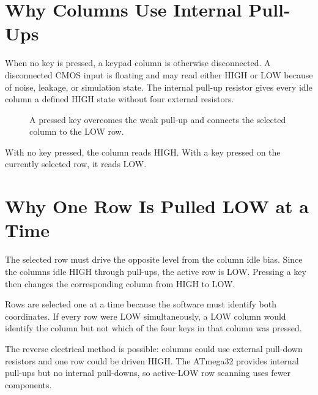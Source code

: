 \documentclass[11pt,a4paper]{article}
\begin{document}
\section{Why Columns Use Internal Pull-Ups}
When no key is pressed, a keypad column is otherwise disconnected. A disconnected CMOS input is floating and may read either HIGH or LOW because of noise, leakage, or simulation state. The internal pull-up resistor gives every idle column a defined HIGH state without four external resistors.

\begin{figure}[H]
\centering
{}
\caption{A pressed key overcomes the weak pull-up and connects the selected column to the LOW row.}
\end{figure}

With no key pressed, the column reads HIGH. With a key pressed on the currently selected row, it reads LOW.

\section{Why One Row Is Pulled LOW at a Time}
The selected row must drive the opposite level from the column idle bias. Since the columns idle HIGH through pull-ups, the active row is LOW. Pressing a key then changes the corresponding column from HIGH to LOW.

Rows are selected one at a time because the software must identify both coordinates. If every row were LOW simultaneously, a LOW column would identify the column but not which of the four keys in that column was pressed.

The reverse electrical method is possible: columns could use external pull-down resistors and one row could be driven HIGH. The ATmega32 provides internal pull-ups but no internal pull-downs, so active-LOW row scanning uses fewer components.
\end{document}
